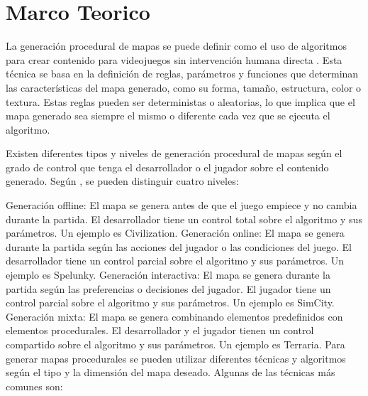 \documentclass[stu, 12pt, letterpaper, donotrepeattitle, floatsintext, natbib]{apa7}
\begin{document}
\section{\large Marco Teorico}
La generación procedural de mapas se puede definir como el uso de algoritmos para crear contenido para videojuegos sin intervención humana directa \noindent {}. Esta técnica se basa en la definición de reglas, parámetros y funciones que determinan las características del mapa generado, como su forma, tamaño, estructura, color o textura. Estas reglas pueden ser deterministas o aleatorias, lo que implica que el mapa generado sea siempre el mismo o diferente cada vez que se ejecuta el algoritmo.

Existen diferentes tipos y niveles de generación procedural de mapas según el grado de control que tenga el desarrollador o el jugador sobre el contenido generado. Según \noindent{}, se pueden distinguir cuatro niveles:

Generación offline: El mapa se genera antes de que el juego empiece y no cambia durante la partida. El desarrollador tiene un control total sobre el algoritmo y sus parámetros. Un ejemplo es Civilization.
Generación online: El mapa se genera durante la partida según las acciones del jugador o las condiciones del juego. El desarrollador tiene un control parcial sobre el algoritmo y sus parámetros. Un ejemplo es Spelunky.
Generación interactiva: El mapa se genera durante la partida según las preferencias o decisiones del jugador. El jugador tiene un control parcial sobre el algoritmo y sus parámetros. Un ejemplo es SimCity.
Generación mixta: El mapa se genera combinando elementos predefinidos con elementos procedurales. El desarrollador y el jugador tienen un control compartido sobre el algoritmo y sus parámetros. Un ejemplo es Terraria.
Para generar mapas procedurales se pueden utilizar diferentes técnicas y algoritmos según el tipo y la dimensión del mapa deseado. Algunas de las técnicas más comunes son:
\end{document}
